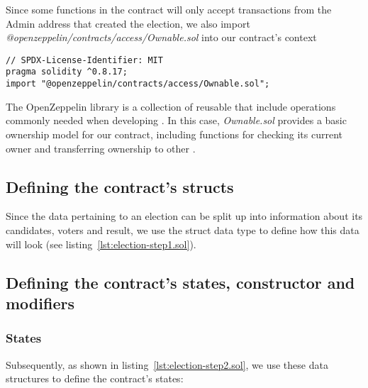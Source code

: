 Since some functions in the contract will only accept transactions from the \gls{Admin} address that created the election, we also import \emph{@openzeppelin/contracts/access/Ownable.sol} into our contract's context

\begin{verbatim}
// SPDX-License-Identifier: MIT
pragma solidity ^0.8.17;
import "@openzeppelin/contracts/access/Ownable.sol";
\end{verbatim}

The OpenZeppelin library is a collection of reusable  that include operations commonly needed when developing .
In this case, \emph{Ownable.sol} provides a basic ownership model for our contract, including functions for checking its current owner and transferring ownership to other .

\subsection{Defining the contract's structs}\label{subsec:defining-the-contracts-structs}

Since the data pertaining to an election can be split up into information about its candidates, voters and result, we use the struct data type to define how this data will look (see listing~\ref{lst:election-step1.sol}).


\subsection{Defining the contract's states, constructor and modifiers}\label{subsec:defining-the-contract's-states-constructor-and-modifiers}


\subsubsection{States}

Subsequently, as shown in listing~\ref{lst:election-step2.sol}, we use these data structures to define the contract's states: 


